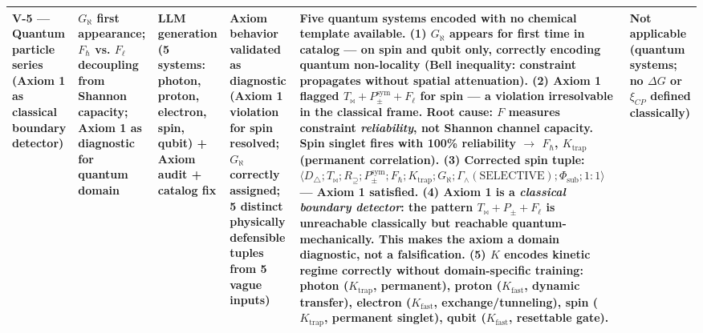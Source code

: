 \documentclass[12pt,a4paper]{article}
\begin{document}
\begin{table}[htbp]
\begin{tabularx}{\textwidth}{>{\centering\arraybackslash}X >{\centering\arraybackslash}X >{\centering\arraybackslash}X >{\centering\arraybackslash}X >{\centering\arraybackslash}X >{\centering\arraybackslash}X}
\textbf{V-5 --- Quantum particle series (Axiom 1 as classical boundary detector)} & $G_{\aleph}$ first appearance; $F_{\hbar}$ vs. $F_{\ell}$ decoupling from Shannon capacity; Axiom 1 as diagnostic for quantum domain & LLM generation (5 systems: photon, proton, electron, spin, qubit) + Axiom audit + catalog fix & \textbf{Axiom behavior validated as diagnostic} (Axiom 1 violation for spin resolved; $G_{\aleph}$ correctly assigned; 5 distinct physically defensible tuples from 5 vague inputs) & Five quantum systems encoded with no chemical template available. (1) $G_{\aleph}$ appears for first time in catalog --- on spin and qubit only, correctly encoding quantum non-locality (Bell inequality: constraint propagates without spatial attenuation). (2) Axiom 1 flagged $T_{\bowtie} + P_{\pm}^{\text{sym}} + F_{\ell}$ for spin --- a violation irresolvable in the classical frame. Root cause: $F$ measures constraint \emph{reliability}, not Shannon channel capacity. Spin singlet fires with 100\% reliability $\to$ $F_{\hbar}$, $K_{\text{trap}}$ (permanent correlation). (3) Corrected spin tuple: $\langle D_{\triangle}; T_{\bowtie}; R_{\supseteq}; P_{\pm}^{\text{sym}}; F_{\hbar}; K_{\text{trap}}; G_{\aleph}; \Gamma_{\wedge}(\text{SELECTIVE}); \Phi_{\text{sub}}; 1:1 \rangle$ --- Axiom 1 satisfied. (4) Axiom 1 is a \emph{classical boundary detector}: the pattern $T_{\bowtie} + P_{\pm} + F_{\ell}$ is unreachable classically but reachable quantum-mechanically. This makes the axiom a domain diagnostic, not a falsification. (5) $K$ encodes kinetic regime correctly without domain-specific training: photon ($K_{\text{trap}}$, permanent), proton ($K_{\text{fast}}$, dynamic transfer), electron ($K_{\text{fast}}$, exchange/tunneling), spin ($K_{\text{trap}}$, permanent singlet), qubit ($K_{\text{fast}}$, resettable gate). & Not applicable (quantum systems; no $\Delta G$ or $\xi_{CP}$ defined classically) \\
\bottomrule
\end{tabularx}
\end{table}
\end{document}
